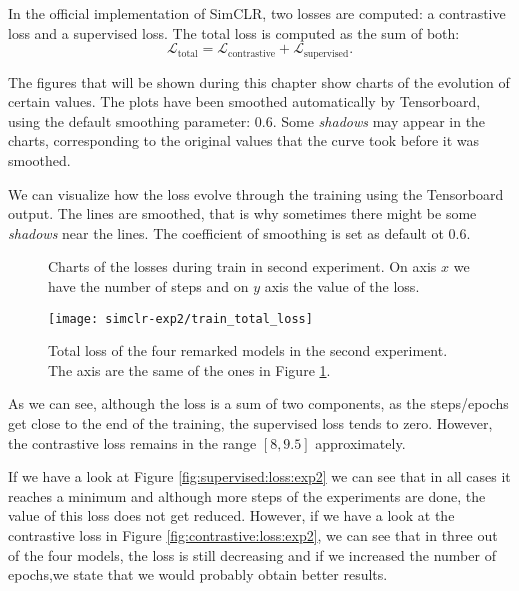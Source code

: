     In the official implementation of SimCLR, two losses are computed: a contrastive loss and a supervised loss. The total loss is computed as the sum of both:
    \[
    \mathcal L_{\operatorname{total}} = \mathcal L_{\operatorname{contrastive} }+ \mathcal L_{\operatorname{supervised}}.    
    \]

\begin{remark}
The figures that will be shown during this chapter show charts of the evolution of certain values. The plots have been smoothed automatically by Tensorboard, using the default smoothing parameter: $0.6$. Some \emph{shadows} may appear in the charts, corresponding to the original values that the curve took before it was smoothed.
\end{remark}

    We can visualize how the loss evolve through the training using the Tensorboard output. The lines are smoothed, that is why sometimes there might be some \emph{shadows} near the lines. The coefficient of smoothing is set as default ot $0.6$. 
    \begin{figure}[htp] 
        \centering
        \hfill%
            \caption{Charts of the losses during train in second experiment. On axis $x$ we have the number of steps and on $y$ axis the value of the loss.}
            \label{fig:exp2:both:losses}
    \end{figure}


\begin{figure}[H]
\centering
\texttt{[image: simclr-exp2/train\_total\_loss]}%
\caption{Total loss of the four remarked models in the second experiment. The axis are the same of the ones in Figure \ref{fig:exp2:both:losses}. }
\label{fig:total:loss:exp2}%
\end{figure}

As we can see, although the loss is a sum of two components, as the steps/epochs get close to the end of the training, the supervised loss tends to zero. However, the contrastive loss remains in the range $[8,9.5]$ approximately. 

If we have a look at Figure \ref{fig:supervised:loss:exp2} we can see that in all cases it reaches a minimum and although more steps of the experiments are done, the value of this loss does not get reduced. However, if we have a look at the contrastive loss in Figure \ref{fig:contrastive:loss:exp2}, we can see that in three out of the four models, the loss is still decreasing and if we increased the number of epochs,we state that we would probably obtain better results.

